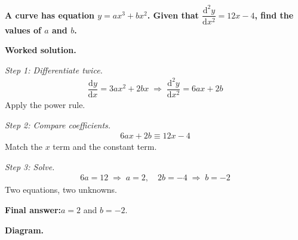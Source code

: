 \documentclass[11pt]{article}
\newcommand{\question}[1]{\par\medskip\noindent\textbf{#1}\par}
\begin{document}
\question{A curve has equation \( y = ax^3 + bx^2 \). Given that \( \dfrac{\mathrm{d}^2y}{\mathrm{d}x^2} = 12x - 4 \), find the values of \( a \) and \( b \).}

\textbf{Worked solution.}

\textit{Step 1: Differentiate twice.}
\[\begin{gathered}
\dfrac{\mathrm{d}y}{\mathrm{d}x} = 3ax^2 + 2bx \;\Rightarrow\; \dfrac{\mathrm{d}^2y}{\mathrm{d}x^2} = 6ax + 2b
\end{gathered}\]
Apply the power rule.

\textit{Step 2: Compare coefficients.}
\[\begin{gathered}
6ax + 2b \equiv 12x - 4
\end{gathered}\]
Match the \( x \) term and the constant term.

\textit{Step 3: Solve.}
\[\begin{gathered}
6a = 12 \;\Rightarrow\; a = 2, \quad 2b = -4 \;\Rightarrow\; b = -2
\end{gathered}\]
Two equations, two unknowns.

\begin{answerbox}
\textbf{Final answer:}\quad \(\displaystyle  a = 2 \) and \(\displaystyle  b = -2 \).
\end{answerbox}
\textbf{Diagram.}
\end{document}
